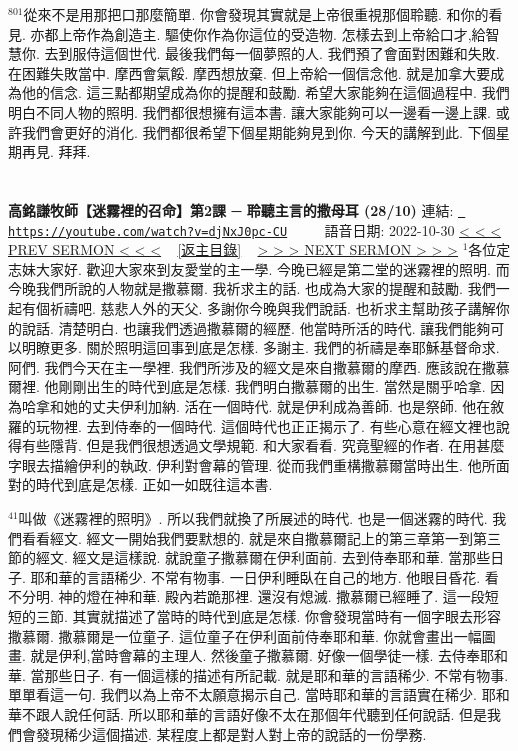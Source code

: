 \documentclass{book}
\begin{document}
$^{801}$從來不是用那把口那麼簡單.
你會發現其實就是上帝很重視那個聆聽.
和你的看見.
亦都上帝作為創造主.
驅使你作為你這位的受造物.
怎樣去到上帝給口才,給智慧你.
去到服侍這個世代.
最後我們每一個夢照的人.
我們預了會面對困難和失敗.
在困難失敗當中.
摩西會氣餒.
摩西想放棄.
但上帝給一個信念他.
就是加拿大要成為他的信念.
這三點都期望成為你的提醒和鼓勵.
希望大家能夠在這個過程中.
我們明白不同人物的照明.
我們都很想擁有這本書.
讓大家能夠可以一邊看一邊上課.
或許我們會更好的消化.
我們都很希望下個星期能夠見到你.
今天的講解到此.
下個星期再見.
拜拜.
\newpage



\section{}
\label{sec:djNxJ0pc_CU}
\textbf{高銘謙牧師【迷霧裡的召命】第2課 ─ 聆聽主言的撒母耳 (28/10)}
\newline
\newline
連結: \href{https://youtube.com/watch?v=djNxJ0pc-CU}{\texttt{ https://youtube.com/watch?v=djNxJ0pc-CU}} ~~~~ 語音日期: 2022-10-30 
\newline
\newline
\hyperref[sec:liEtjDNazis]{\small{< < < PREV SERMON < < <}}
~
\hyperref[sec:index]{\small{[返主目錄]}}
~
\hyperref[sec:H4gdcVXwfVM]{\small{> > > NEXT SERMON > > >}}
\newline
\newline
$^{1}$各位定志妹大家好.
歡迎大家來到友愛堂的主一學.
今晚已經是第二堂的迷霧裡的照明.
而今晚我們所說的人物就是撒慕爾.
我祈求主的話.
也成為大家的提醒和鼓勵.
我們一起有個祈禱吧.
慈悲人外的天父.
多謝你今晚與我們說話.
也祈求主幫助孩子講解你的說話.
清楚明白.
也讓我們透過撒慕爾的經歷.
他當時所活的時代.
讓我們能夠可以明瞭更多.
關於照明這回事到底是怎樣.
多謝主.
我們的祈禱是奉耶穌基督命求.
阿們.
我們今天在主一學裡.
我們所涉及的經文是來自撒慕爾的摩西.
應該說在撒慕爾裡.
他剛剛出生的時代到底是怎樣.
我們明白撒慕爾的出生.
當然是關乎哈拿.
因為哈拿和她的丈夫伊利加納.
活在一個時代.
就是伊利成為善師.
也是祭師.
他在敘羅的玩物裡.
去到侍奉的一個時代.
這個時代也正正揭示了.
有些心意在經文裡也說得有些隱背.
但是我們很想透過文學規範.
和大家看看.
究竟聖經的作者.
在用甚麼字眼去描繪伊利的執政.
伊利對會幕的管理.
從而我們重構撒慕爾當時出生.
他所面對的時代到底是怎樣.
正如一如既往這本書.

$^{41}$叫做《迷霧裡的照明》.
所以我們就換了所展述的時代.
也是一個迷霧的時代.
我們看看經文.
經文一開始我們要默想的.
就是來自撒慕爾記上的第三章第一到第三節的經文.
經文是這樣說.
就說童子撒慕爾在伊利面前.
去到侍奉耶和華.
當那些日子.
耶和華的言語稀少.
不常有物事.
一日伊利睡臥在自己的地方.
他眼目昏花.
看不分明.
神的燈在神和華.
殿內若跪那裡.
還沒有熄滅.
撒慕爾已經睡了.
這一段短短的三節.
其實就描述了當時的時代到底是怎樣.
你會發現當時有一個字眼去形容撒慕爾.
撒慕爾是一位童子.
這位童子在伊利面前侍奉耶和華.
你就會畫出一幅圖畫.
就是伊利,當時會幕的主理人.
然後童子撒慕爾.
好像一個學徒一樣.
去侍奉耶和華.
當那些日子.
有一個這樣的描述有所記載.
就是耶和華的言語稀少.
不常有物事.
單單看這一句.
我們以為上帝不太願意揭示自己.
當時耶和華的言語實在稀少.
耶和華不跟人說任何話.
所以耶和華的言語好像不太在那個年代聽到任何說話.
但是我們會發現稀少這個描述.
某程度上都是對人對上帝的說話的一份學務.
\end{document}
